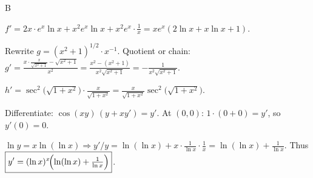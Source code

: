\documentclass[11pt]{article}
\begin{document}
\begin{answers}{B}
\item $f' = 2x \cdot e^x \ln x + x^2 e^x \ln x + x^2 e^x \cdot \tfrac{1}{x} = \boxed{x e^x(2 \ln x + x \ln x + 1)}$.
\item Rewrite $g = (x^2+1)^{1/2} \cdot x^{-1}$. Quotient or chain:
  $g' = \tfrac{x \cdot \tfrac{x}{\sqrt{x^2+1}} - \sqrt{x^2+1}}{x^2} = \tfrac{x^2 - (x^2+1)}{x^2 \sqrt{x^2+1}} = \boxed{-\tfrac{1}{x^2 \sqrt{x^2+1}}}$.
\item $h' = \sec^2\!\bigl(\sqrt{1+x^2}\bigr) \cdot \tfrac{x}{\sqrt{1+x^2}} = \boxed{\tfrac{x}{\sqrt{1+x^2}} \sec^2\!\bigl(\sqrt{1+x^2}\bigr)}$.
\item Differentiate: $\cos(xy)\,(y + x y') = y'$. At $(0,0)$: $1\cdot(0 + 0) = y'$, so $\boxed{y'(0) = 0}$.
\item $\ln y = x \ln(\ln x) \Rightarrow y'/y = \ln(\ln x) + x \cdot \tfrac{1}{\ln x} \cdot \tfrac{1}{x} = \ln(\ln x) + \tfrac{1}{\ln x}$. Thus $\boxed{y' = (\ln x)^x \!\Bigl(\ln(\ln x) + \tfrac{1}{\ln x}\Bigr)}$.
\end{answers}
\end{document}
